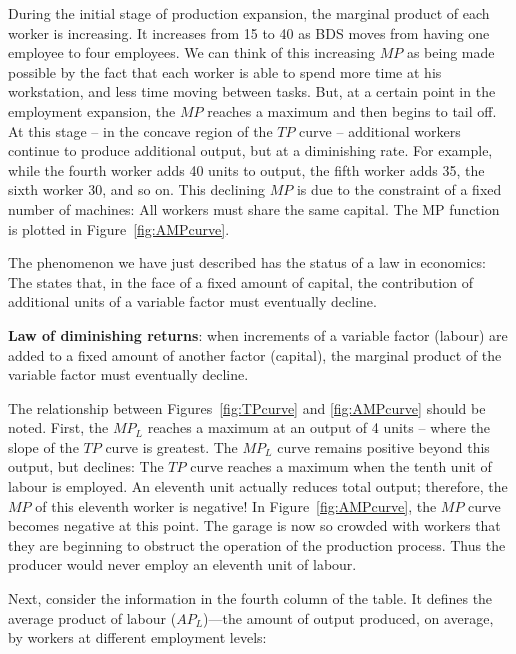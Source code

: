 During the initial stage of production expansion, the marginal product of each worker is increasing. It increases from 15 to 40 as BDS moves from having one employee to four employees. We can think of this increasing $MP$ as being made possible by the fact that each worker is able to spend more time at his workstation, and less time moving between tasks. But, at a certain point in the employment expansion, the $MP$ reaches a maximum and then begins to tail off. At this stage -- in the concave region of the $TP$ curve -- additional workers continue to produce additional output, but at a diminishing rate. For example, while the fourth worker adds 40 units to output, the fifth worker adds 35, the sixth worker 30, and so on. This declining $MP$ is due to the constraint of a fixed number of machines: All workers must share the same capital. The MP function is plotted in Figure~\ref{fig:AMPcurve}.



The phenomenon we have just described has the status of a law in economics: The  states that, in the face of a fixed amount of capital, the contribution of additional units of a variable factor must eventually decline.

\begin{DefBox}
\textbf{Law of diminishing returns}: when increments of a variable factor (labour) are added to a fixed amount of another factor (capital), the marginal product of the variable factor must eventually decline.
\end{DefBox}

The relationship between Figures~\ref{fig:TPcurve} and \ref{fig:AMPcurve} should be noted. First, the $MP_L$ reaches a maximum at an output of 4 units -- where the slope of the $TP$ curve is greatest. The $MP_L$ curve remains positive beyond this output, but declines: The $TP$ curve reaches a maximum when the tenth unit of labour is employed. An eleventh unit actually reduces total output; therefore, the $MP$ of this eleventh worker is negative! In Figure~\ref{fig:AMPcurve}, the $MP$ curve becomes negative at this point. The garage is now so crowded with workers that they are beginning to obstruct the operation of the production process. Thus the producer would never employ an eleventh unit of labour.

Next, consider the information in the fourth column of the table. It defines the average product of labour ($AP_L$)---the amount of output produced, on average, by workers at different employment levels:

